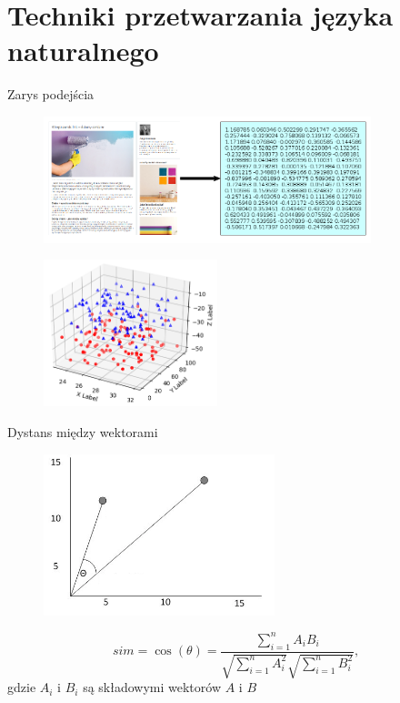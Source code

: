 \documentclass{beamer}
\begin{document}
	\section{Techniki przetwarzania języka naturalnego}
	\begin{frame}{Zarys podejścia}
		\begin{figure}
			\centering
			\includegraphics[width=0.85\textwidth]{img/approach_outline.png}
		\end{figure}
		\begin{figure}
			\centering
			\includegraphics[width=0.45\textwidth]{img/scatter3d_demo.png}
		\end{figure}
	\end{frame}
	\begin{frame}{Dystans między wektorami}
		\begin{figure}
			\centering
			\includegraphics[width=0.6\textwidth]{img/cos.png}
		\end{figure}%
		\begin{equation}
		\label{eq:cos}
		sim=\cos(\theta )={\frac {\sum \limits _{i=1}^{n}{A_{i}B_{i}}}{{\sqrt {\sum \limits _{i=1}^{n}{A_{i}^{2}}}}{\sqrt {\sum \limits _{i=1}^{n}{B_{i}^{2}}}}}},
		\end{equation}
		gdzie $A_i$ i $B_i$ są składowymi wektorów $A$ i $B$
	\end{frame}
\end{document}
